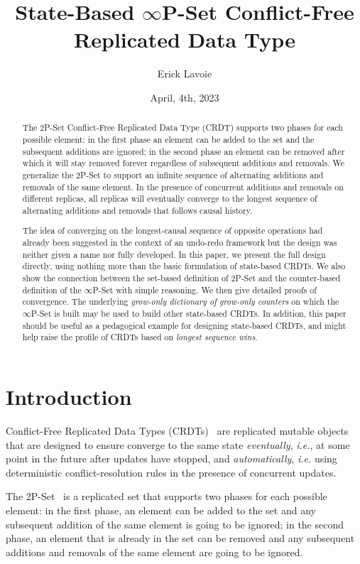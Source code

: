 \documentclass[9pt, oneside]{article}   	%
\title{State-Based $\infty$P-Set Conflict-Free Replicated Data Type}
\author{Erick Lavoie}
\date{April, 4th, 2023}							%
\begin{document}
\maketitle


\begin{abstract}
The 2P-Set Conflict-Free Replicated Data Type (CRDT) supports two phases for each possible element: in the first phase an element can be added to the set and the subsequent additions are ignored; in the second phase an element can be removed after which it will stay removed forever regardless of subsequent additions and removals. We generalize the 2P-Set to support an infinite sequence of alternating additions and removals of the same element. In the presence of concurrent additions and removals on different replicas, all replicas will eventually converge to the longest sequence of alternating additions and removals that follows causal history. 

The idea of converging on the longest-causal sequence of opposite operations had already been suggested in the context of an undo-redo framework but the design was neither given a name nor fully developed. In this paper, we present the full design directly, using nothing more than the basic formulation of state-based CRDTs. We also show the connection between the set-based definition of 2P-Set and the counter-based definition of the $\infty$P-Set with simple reasoning. We then give detailed proofs of convergence. The underlying \textit{grow-only dictionary of grow-only counters} on which the $\infty$P-Set is built may be used to build other state-based CRDTs. In addition, this paper should be useful as a pedagogical example for designing state-based CRDTs, and might help raise the profile of CRDTs based on \textit{longest sequence wins}.
\end{abstract}

\section{Introduction}

Conflict-Free Replicated Data Types (CRDTs)~\cite{shapiro:hal-00932836} are replicated mutable objects that are designed to ensure converge to the same state \textit{eventually}, \textit{i.e.}, at some point in the future after updates have stopped, and \textit{automatically}, \textit{i.e.} using deterministic conflict-resolution rules in the presence of concurrent updates. 

The 2P-Set~\cite{shapiro:inria-00555588} is a replicated set that supports two phases for each possible element: in the first phase, an element can be added to the set and any subsequent addition of the same element is going to be ignored; in the second phase, an element that is already in the set can be removed and any subsequent additions and removals of the same element are going to be ignored.
\end{document}
